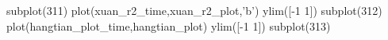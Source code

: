 subplot(311)
plot(xuan_r2_time,xuan_r2_plot,'b')
ylim([-1 1])
subplot(312)
plot(hangtian_plot_time,hangtian_plot)
ylim([-1 1])
subplot(313)
